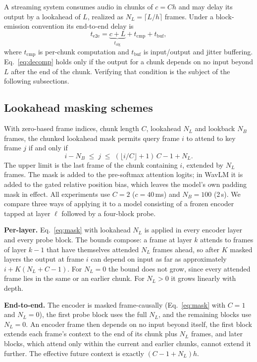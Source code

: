 \documentclass[journal]{IEEEtran}
\newcommand{\talg}{\ensuremath{t_{\mathrm{alg}}}}
\newcommand{\tcmp}{\ensuremath{t_{\mathrm{cmp}}}}
\newcommand{\tbuf}{\ensuremath{t_{\mathrm{buf}}}}
\begin{document}
A streaming system consumes audio in chunks of $c=Ch$ and may delay its
output by a lookahead of $L$, realized as $N_L=\lceil L/h\rceil$ frames. Under
a block-emission convention its end-to-end delay is
\begin{equation}
t_{\mathrm{e2e}} = \underbrace{c + L}_{\talg} + \tcmp + \tbuf ,
\label{eq:decomp}
\end{equation}
where \tcmp{} is per-chunk computation and \tbuf{} is input/output and jitter
buffering. Eq.~\ref{eq:decomp} holds only if the output for a chunk depends on
no input beyond $L$ after the end of the chunk. Verifying that condition is
the subject of the following subsections.

\subsection{Lookahead masking schemes}
\label{sec:mask}

With zero-based frame indices, chunk length $C$, lookahead $N_L$ and lookback
$N_B$ frames, the chunked lookahead mask permits query frame $i$ to attend to
key frame $j$ if and only if
\begin{equation}
i - N_B \;\le\; j \;\le\; (\lfloor i/C \rfloor + 1)\,C - 1 + N_L .
\label{eq:mask}
\end{equation}
The upper limit is the last frame of the chunk containing $i$, extended by
$N_L$ frames. The mask is added to the pre-softmax attention logits; in WavLM
it is added to the gated relative position bias, which leaves the model's own
padding mask in effect. All experiments use $C=2$ ($c=40$\,ms) and $N_B=100$
(2\,s). We compare three ways of applying it to a model consisting of a
frozen encoder tapped at layer $\ell$ followed by a four-block probe.

\textbf{Per-layer.} Eq.~\ref{eq:mask} with lookahead $N_L$ is applied in every
encoder layer and every probe block. The bounds compose: a frame at layer $k$
attends to frames of layer $k{-}1$ that have themselves attended $N_L$ frames
ahead, so after $K$ masked layers the output at frame $i$ can depend on input
as far as approximately $i + K(N_L + C - 1)$. For $N_L=0$ the bound does not
grow, since every attended frame lies in the same or an earlier chunk. For
$N_L>0$ it grows linearly with depth.

\textbf{End-to-end.} The encoder is masked frame-causally (Eq.~\ref{eq:mask}
with $C=1$ and $N_L=0$), the first probe block uses the full $N_L$, and the
remaining blocks use $N_L=0$. An encoder frame then depends on no input
beyond itself, the first block extends each frame's context to the end of its
chunk plus $N_L$ frames, and later blocks, which attend only within the
current and earlier chunks, cannot extend it further. The effective future
context is exactly $(C-1+N_L)h$.
\end{document}
